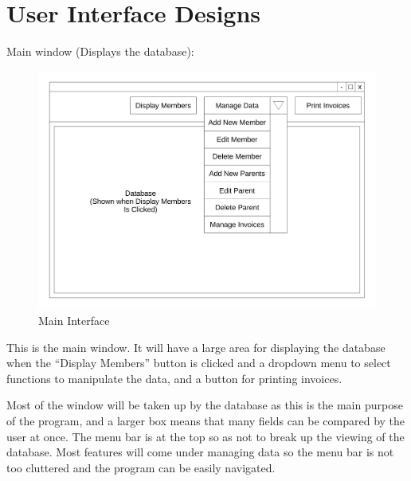 \section{User Interface Designs}

Main window (Displays the database):
\begin{figure}[H]
\includegraphics[width=\textwidth]{./Design/images/Main_Interface_Design.pdf}
    \caption{Main Interface} \label{fig:Interface Design}
\end{figure}
This is the main window. It will have a large area for displaying the database when the ``Display Members'' button is clicked and a dropdown menu to select functions to manipulate the data, and a button for printing invoices.

Most of the window will be taken up by the database as this is the main purpose of the program, and a larger box means that many fields can be compared by the user at once. The menu bar is at the top so as not to break up the viewing of the database. Most features will come under managing data so the menu bar is not too cluttered and the program can be easily navigated.

